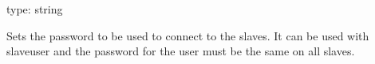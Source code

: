 \documentclass[letterpaper,10pt,english]{sphinxmanual}
\begin{document}
\begin{fulllineitems}
\label{\detokenize{mariadb-schema-change:cmdoption-mariadb-schema-change-slave-password}}
\sphinxAtStartPar
type: string

\sphinxAtStartPar
Sets the password to be used to connect to the slaves.
It can be used with \textendash{}slave\sphinxhyphen{}user and the password for the user must be the same
on all slaves.

\end{fulllineitems}

\end{document}
